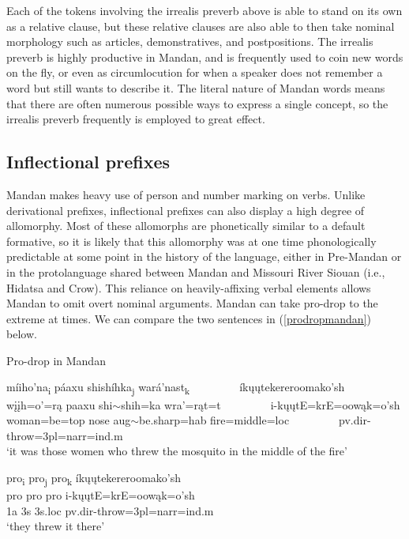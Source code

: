 Each of the tokens involving the irrealis preverb above is able to stand on its own as a relative clause, but these relative clauses are also able to then take nominal morphology such as articles, demonstratives, and postpositions. The irrealis preverb is highly productive in Mandan, and is frequently used to coin new words on the fly, or even as circumlocution for when a speaker does not remember a word but still wants to describe it. The literal nature of Mandan words means that there are often numerous possible ways to express a single concept, so the irrealis preverb frequently is employed to great effect.

\subsection{Inflectional prefixes}\label{Ch2InflectionalPrefixes}

Mandan makes heavy use of person and number marking on verbs. Unlike derivational prefixes, inflectional prefixes can also display a high degree of allomorphy. Most of these allomorphs are phonetically similar to a default formative, so it is likely that this allomorphy was at one time phonologically predictable at some point in the history of the language, either in Pre-Mandan or in the protolanguage shared between Mandan and Missouri River Siouan (i.e., Hidatsa and Crow). This reliance on heavily-affixing verbal elements allows Mandan to omit overt nominal arguments. Mandan can take {pro}-drop to the extreme at times. We can compare the two sentences in (\ref{prodropmandan}) below.

\begin{exe}

\item\label{prodropmandan} {Pro}-drop in Mandan

	\begin{xlist}
	
	\item \glll míiho'na\textnormal{\textsubscript{i}} páaxu shishíhka\textnormal{\textsubscript{j}} wará'nast\textnormal{\textsubscript{k}} ~ ~ ~ ~ ~  íkųųtekereroomako'sh\\
	wįįh=o'=rą paaxu shi$\sim$shih=ka wra'=rąt=t ~ ~ ~ ~ ~ i-kųųtE=krE=oowąk=o'sh\\
	\textnormal{woman}=\textnormal{be}=top \textnormal{nose} aug$\sim$\textnormal{be.sharp}=hab \textnormal{fire}=\textnormal{middle}=loc ~ ~ ~ ~ ~ pv.dir-\textnormal{throw}=3pl=narr=ind.m\\
	\glt `it was those women who threw the mosquito in the middle of the fire' \citep[153]{hollow1973b}
	
	\item \glll	\textnormal{pro\textsubscript{i}} \textnormal{pro\textsubscript{j}} \textnormal{pro\textsubscript{k}} íkųųtekereroomako'sh\\
	pro pro pro i-kųųtE=krE=oowąk=o'sh\\
	1a 3s 3s.loc pv.dir-\textnormal{throw}=3pl=narr=ind.m\\
	\glt `they threw it there'
	
	\end{xlist}

\end{exe}

